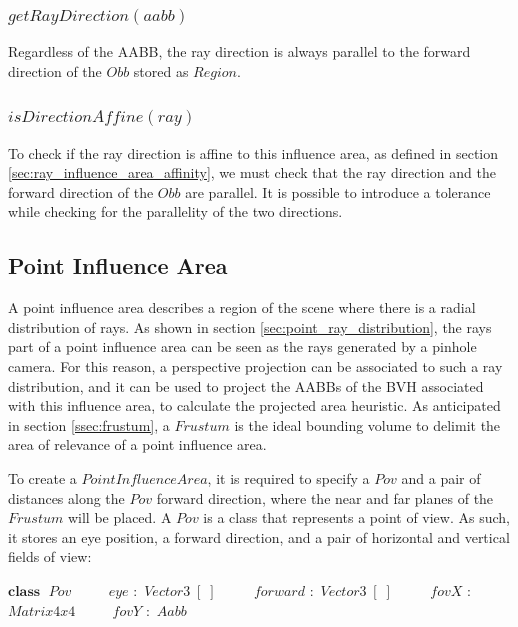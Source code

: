 \documentclass{PoliMi_MasterThesis}
\newcommand*\Class[1]{\State $\textbf{class} \;$ #1}
\newcommand*\Member[2]{\State $\qquad$ #1 $:$ #2}
\begin{document}
\subsubsection*{$getRayDirection(aabb)$}
Regardless of the AABB, the ray direction is always parallel to the forward direction of the $Obb$ stored as $Region$.

\subsubsection*{$isDirectionAffine(ray)$}
To check if the ray direction is affine to this influence area, as defined in section \ref{sec:ray_influence_area_affinity}, we must check that the ray direction and the forward direction of the $Obb$ are parallel. It is possible to introduce a tolerance while checking for the parallelity of the two directions.

\subsection{Point Influence Area} \label{ssec:point_influence_area}
A point influence area describes a region of the scene where there is a radial distribution of rays. As shown in section \ref{sec:point_ray_distribution}, the rays part of a point influence area can be seen as the rays generated by a pinhole camera. For this reason, a perspective projection can be associated to such a ray distribution, and it can be used to project the AABBs of the BVH associated with this influence area, to calculate the projected area heuristic. As anticipated in section \ref{ssec:frustum}, a $Frustum$ is the ideal bounding volume to delimit the area of relevance of a point influence area.

To create a $PointInfluenceArea$, it is required to specify a $Pov$ and a pair of distances along the $Pov$ forward direction, where the near and far planes of the $Frustum$ will be placed. A $Pov$ is a class that represents a point of view. As such, it stores an eye position, a forward direction, and a pair of horizontal and vertical fields of view:

\begin{algorithm}[H]
	\begin{algorithmic}
		\Class{$Pov$}
		\Member{$eye$}{$Vector3\;[\;]$}
		\Member{$forward$}{$Vector3\;[\;]$}
		\Member{$fovX$}{$Matrix4x4$}
		\Member{$fovY$}{$Aabb$}
	\end{algorithmic}
\end{algorithm} 
\end{document}
